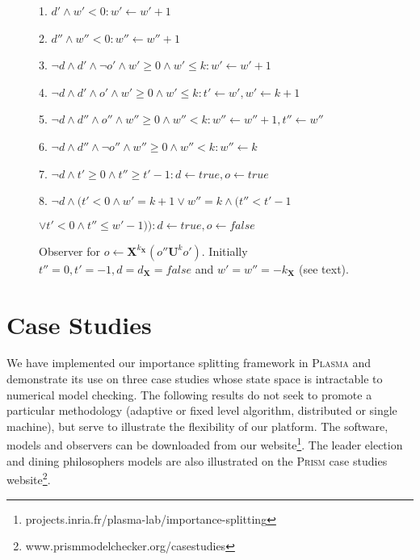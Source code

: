 \documentclass{llncs}
\begin{document}
\begin{figure}
\begin{minipage}[c]{0.25\columnwidth}\centering
{}\end{minipage}\begin{minipage}[c]{0.74\columnwidth}1. $d'\wedge w'<0:w'\leftarrow w'+1$

2. $d''\wedge w''<0:w''\leftarrow w''+1$

3. $\neg d\wedge d'\wedge\neg o'\wedge w'\geq0\wedge w'\leq k:w'\leftarrow w'+1$

4. $\neg d\wedge d'\wedge o'\wedge w'\geq0\wedge w'\leq k:t'\leftarrow w',w'\leftarrow k+1$

5. $\neg d\wedge d''\wedge o''\wedge w''\geq0\wedge w''<k:w''\leftarrow w''+1,t''\leftarrow w''$

6. $\neg d\wedge d''\wedge\neg o''\wedge w''\geq0\wedge w''<k:w''\leftarrow k$

7. $\neg d\wedge t'\geq0\wedge t''\geq t'-1:d\leftarrow\mathit{true},o\leftarrow\mathit{true}$

8. $\neg d\wedge(t'<0\wedge w'=k+1\vee w''=k\wedge(t''<t'-1$

\qquad{}\qquad{}$\vee t'<0\wedge t''\leq w'-1)):d\leftarrow\mathit{true},o\leftarrow\mathit{false}$\end{minipage}

\protect\caption{Observer for $o\leftarrow\mathbf{X}^{k_{\mathbf{X}}}(o''\mathbf{U}^{k}o')$.
Initially $t''=0,t'=-1,d=d_{\mathbf{X}}=\mathit{false}$ and $w'=w''=-k_{\mathbf{X}}$
(see text).\label{fig:Uouter}}
\end{figure}


\vspace{-1em}



\section{Case Studies\label{sec:examples}}

We have implemented our importance splitting framework in \textsc{Plasma}
\cite{BoyerCorreLegaySedwards2013} and demonstrate its use on three
case studies whose state space is intractable to numerical model checking.
The following results do not seek to promote a particular methodology
(adaptive or fixed level algorithm, distributed or single machine),
but serve to illustrate the flexibility of our platform. The software,
models and observers can be downloaded from our website\textsc{}\footnote{projects.inria.fr/plasma-lab/importance-splitting\label{fn:webpage}}.
The leader election and dining philosophers models are also illustrated
on the \textsc{Prism} case studies website\footnote{www.prismmodelchecker.org/casestudies\label{fn:prism}}.
\end{document}
